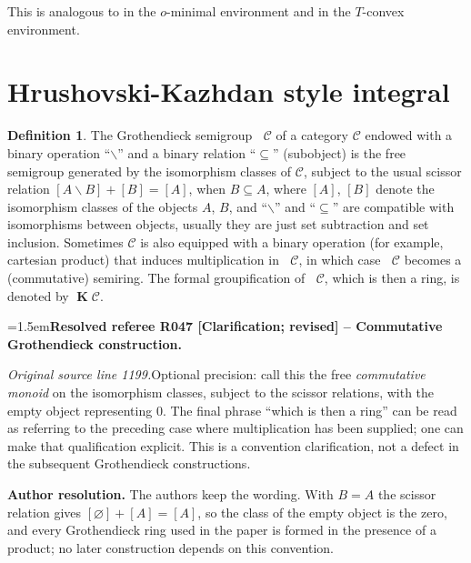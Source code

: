 \documentclass[12pt]{amsart}
\newcommand{\ResolvedRefereeRemark}[5]{%
  \par\medskip\begingroup\normalfont\small\color{gray}%
  \emergencystretch=1.5em\noindent\textbf{Resolved referee R#1 [#2] -- #3.}\par\nobreak\noindent #4\par
  \medskip\color{ResolutionGreen}\noindent\textbf{Author resolution.} #5\par
  \endgroup\medskip
}
\theoremstyle{plain}
\theoremstyle{definition}
\newtheorem{defn}[thm]{Definition}
\theoremstyle{remark}
\numberwithin{equation}{section}
\theoremstyle{plain}
\newcommand{\omin}{$o$\nobreakdash}
\newcommand{\T}{$T$\nobreakdash}
\newcommand{\0}{\emptyset}
\newcommand{\mdl}[1]{\mathcal{#1}}  %
\newcommand{\mi}{\smallsetminus}
\DeclareMathOperator{\gsk}{\mathbf{K}_+}
\DeclareMathOperator{\ggk}{\mathbf{K}}
\begin{document}
This is analogous to \cite[Corollary~6.2.4]{dries:1998} in the \omin-minimal environment and \cite[Lemma~2.38]{Yin:tcon:1.5} in the \T-convex environment.


\section{Hrushovski-Kazhdan style integral}\label{sec:HK:main}

\begin{defn}
\label{def:Kgroup}
The Grothendieck semigroup $\gsk \mdl C$ of a category $\mdl C$ endowed with a binary operation ``$\mi$'' and a binary relation ``$\subseteq$'' (subobject) is the free semigroup generated by the isomorphism classes of $\mdl C$, subject to the usual scissor relation
$[A \mi B] + [B] = [A]$, when $B\subseteq A$,
where $[A]$, $[B]$ denote the isomorphism classes of the objects $A$, $B$, and ``$\mi$'' and ``$\subseteq$'' are compatible with isomorphisms between objects, usually they are just set subtraction and set inclusion. Sometimes $\mdl C$ is also equipped with a binary operation (for example, cartesian product) that induces multiplication in $\gsk \mdl C$, in which case $\gsk \mdl C$ becomes a (commutative) semiring. The formal groupification of  $\gsk \mdl C$, which is then a ring, is denoted by $\ggk \mdl C$. %

\ResolvedRefereeRemark{047}{Clarification; revised}{Commutative Grothendieck construction}{%
\textit{Original source line 1199.}\quad Optional precision: call this the free \emph{commutative monoid} on the isomorphism classes, subject to the scissor relations, with the empty object representing $0$. The final phrase ``which is then a ring'' can be read as referring to the preceding case where multiplication has been supplied; one can make that qualification explicit. This is a convention clarification, not a defect in the subsequent Grothendieck constructions.
}{The authors keep the wording. With $B = A$ the scissor relation gives $[\varnothing] + [A] = [A]$, so the class of the empty object is the zero, and every Grothendieck ring used in the paper is formed in the presence of a product; no later construction depends on this convention.}
\end{defn}
\end{document}
